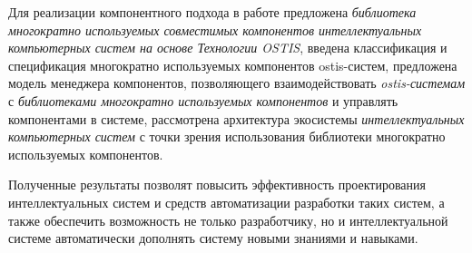 Для реализации компонентного подхода в работе предложена \textit{библиотека многократно используемых совместимых компонентов интеллектуальных компьютерных систем на основе Технологии OSTIS}, введена классификация и спецификация многократно используемых компонентов ostis-систем, предложена модель менеджера компонентов, позволяющего взаимодействовать \textit{ostis-системам} с \textit{библиотеками многократно используемых компонентов} и управлять компонентами в системе, рассмотрена архитектура экосистемы \textit{интеллектуальных компьютерных систем} с точки зрения использования библиотеки многократно используемых компонентов.

Полученные результаты позволят повысить эффективность проектирования интеллектуальных систем и средств автоматизации разработки таких систем, а также обеспечить возможность не только разработчику, но и интеллектуальной системе автоматически дополнять систему новыми знаниями и навыками.

%